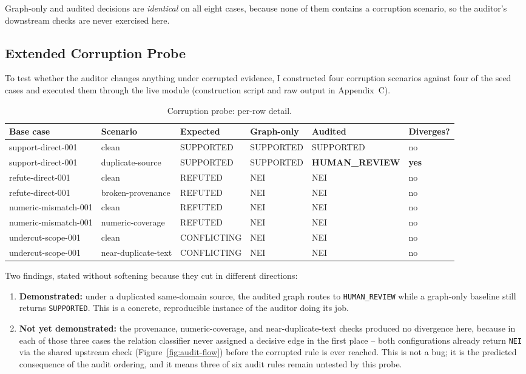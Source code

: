 \documentclass[12pt,a4paper,openany]{report}
\begin{document}
Graph-only and audited decisions are \emph{identical} on all eight cases, because none of them contains a corruption scenario, so the auditor's downstream checks are never exercised here.

\subsection{Extended Corruption Probe}
To test whether the auditor changes anything under corrupted evidence, I constructed four corruption scenarios against four of the seed cases and executed them through the live module (construction script and raw output in Appendix~C).

\begin{table}[H]
\centering
\caption{Corruption probe: per-row detail.}
\label{tab:corruption-detail-2}
\scriptsize
\begin{tabularx}{\textwidth}{p{2.0cm}p{2.4cm}p{1.7cm}p{1.7cm}p{2.1cm}p{1.3cm}}
\toprule
Base case & Scenario & Expected & Graph-only & Audited & Diverges? \\
\midrule
support-direct-001 & clean & SUPPORTED & SUPPORTED & SUPPORTED & no \\
support-direct-001 & duplicate-source & SUPPORTED & SUPPORTED & \textbf{HUMAN\_\allowbreak REVIEW} & \textbf{yes} \\
refute-direct-001 & clean & REFUTED & NEI & NEI & no \\
refute-direct-001 & broken-provenance & REFUTED & NEI & NEI & no \\
numeric-mismatch-001 & clean & REFUTED & NEI & NEI & no \\
numeric-mismatch-001 & numeric-coverage & REFUTED & NEI & NEI & no \\
undercut-scope-001 & clean & CONFLICTING & NEI & NEI & no \\
undercut-scope-001 & near-duplicate-text & CONFLICTING & NEI & NEI & no \\
\bottomrule
\end{tabularx}
\end{table}

Two findings, stated without softening because they cut in different directions:
\begin{enumerate}
  \item \textbf{Demonstrated:} under a duplicated same-domain source, the audited graph routes to \texttt{HUMAN\_REVIEW} while a graph-only baseline still returns \texttt{SUPPORTED}. This is a concrete, reproducible instance of the auditor doing its job.
  \item \textbf{Not yet demonstrated:} the provenance, numeric-coverage, and near-duplicate-text checks produced no divergence here, because in each of those three cases the relation classifier never assigned a decisive edge in the first place -- both configurations already return \texttt{NEI} via the shared upstream check (Figure~\ref{fig:audit-flow}) before the corrupted rule is ever reached. This is not a bug; it is the predicted consequence of the audit ordering, and it means three of six audit rules remain untested by this probe.
\end{enumerate}
\end{document}
